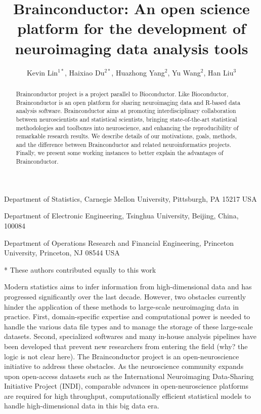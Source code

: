 \documentclass{nature}
\title{Brainconductor: An open science platform for the development of
neuroimaging
data analysis tools}
\author{Kevin Lin$^{1*}$, Haixiao Du$^{2*}$, Huazhong
Yang$^2$, Yu Wang$^2$, Han Liu$^3$}
\begin{document}
\maketitle



\begin{affiliations}
\item Department of Statistics, Carnegie Mellon University,
Pittsburgh, PA 15217 USA
\item Department of Electronic Engineering, Tsinghua University, Beijing, China,
100084
\item Department of Operations Research and Financial Engineering, Princeton
University, Princeton, NJ 08544 USA
\item[*] These authors contributed equally to this work
\end{affiliations}

\begin{abstract}
    Brainconductor project is a project parallel to Bioconductor. Like
Bioconductor, Brainconductor is an open platform for sharing neuroimaging data
and R-based data analysis software. Brainconductor aims at promoting
interdisciplinary collaboration between neuroscientists and
statistical scientists, bringing state-of-the-art statistical methodologies and
toolboxes into neuroscience, and enhancing the reproducibility of remarkable
research results. We describe details of our motivations, goals, methods, and
the difference between Brainconductor and related neuroinformatics projects.
Finally, we present some working instances to better explain the advantages of
Brainconductor.
\end{abstract}


Modern statistics aims to infer information from high-dimensional data
and has progressed significantly over the last decade.
However, two obstacles currently hinder the
application of these methods to large-scale neuroimaging data
in practice.
First, domain-specific expertise and computational power is needed to handle
the various data file types and to manage the storage
of these large-scale datasets. Second, specialized softwares and
many in-house analysis pipelines have been developed that
prevent new researchers from entering the field {\color{red}(why? the logic is not clear here)}.
The Brainconductor project is an open-neuroscience
initiative to address
these obstacles.
As the neuroscience community expands upon open-access
datasets such as the  International Neuroimaging Data-Sharing
Initiative Project (INDI), comparable advances in
open-neuroscience platforms are required
for high
throughput, computationally efficient statistical models
to handle high-dimensional data in this big data era.
\end{document}
